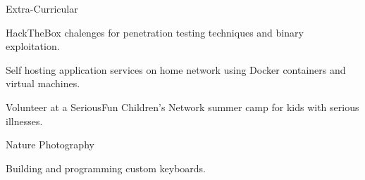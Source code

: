 \documentclass{resume} %
\begin{document}
\begin{rSection}{Extra-Curricular} \itemsep -3pt
	\item HackTheBox chalenges for penetration testing techniques and binary exploitation.
	\item Self hosting application services on home network using Docker containers and virtual machines.
	\item Volunteer at a SeriousFun Children's Network summer camp for kids with serious illnesses.
	\item Nature Photography
	\item Building and programming custom keyboards. 
\end{rSection}

\end{document}
